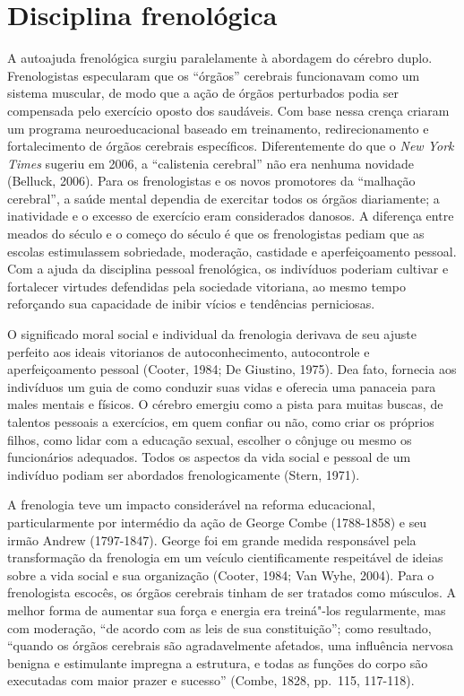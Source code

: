\section{Disciplina frenológica}

A autoajuda frenológica surgiu paralelamente à abordagem do cérebro
duplo. Frenologistas especularam que os ``órgãos'' cerebrais funcionavam
como um sistema muscular, de modo que a ação de órgãos perturbados podia
ser compensada pelo exercício oposto dos saudáveis. Com base nessa
crença criaram um programa neuroeducacional baseado em treinamento,
redirecionamento e fortalecimento de órgãos cerebrais específicos.
Diferentemente do que o \emph{New York Times} sugeriu em 2006, a
``calistenia cerebral'' não era nenhuma novidade (Belluck, 2006). Para
os frenologistas e os novos promotores da ``malhação cerebral'', a saúde
mental dependia de exercitar todos os órgãos diariamente; a inatividade
e o excesso de exercício eram considerados danosos. A diferença entre
meados do século  e o começo do século  é que os frenologistas
pediam que as escolas estimulassem sobriedade, moderação, castidade e
aperfeiçoamento pessoal. Com a ajuda da disciplina pessoal frenológica,
os indivíduos poderiam cultivar e fortalecer virtudes defendidas pela
sociedade vitoriana, ao mesmo tempo reforçando sua capacidade de inibir
vícios e tendências perniciosas.

O significado moral social e individual da frenologia derivava de seu
ajuste perfeito aos ideais vitorianos de autoconhecimento, autocontrole
e aperfeiçoamento pessoal (Cooter, 1984; De Giustino, 1975). Dea fato,
fornecia aos indivíduos um guia de como conduzir suas vidas e oferecia
uma panaceia para males mentais e físicos. O cérebro emergiu como a
pista para muitas buscas, de talentos pessoais a exercícios, em quem
confiar ou não, como criar os próprios filhos, como lidar com a
educação sexual, escolher o cônjuge ou mesmo os funcionários adequados.
Todos os aspectos da vida social e pessoal de um indivíduo podiam ser
abordados frenologicamente (Stern, 1971).

A frenologia teve um impacto considerável na reforma educacional,
particularmente por intermédio da ação de George Combe (1788-1858) e seu
irmão Andrew (1797-1847). George foi em grande medida responsável pela
transformação da frenologia em um veículo cientificamente respeitável de
ideias sobre a vida social e sua organização (Cooter, 1984; Van Wyhe,
2004). Para o frenologista escocês, os órgãos cerebrais tinham de ser
tratados como músculos. A melhor forma de aumentar sua força e energia
era treiná"-los regularmente, mas com moderação, ``de acordo com as leis
de sua constituição''; como resultado, ``quando os órgãos cerebrais são
agradavelmente afetados, uma influência nervosa benigna e estimulante
impregna a estrutura, e todas as funções do corpo são executadas com
maior prazer e sucesso'' (Combe, 1828, pp.~115, 117-118).

